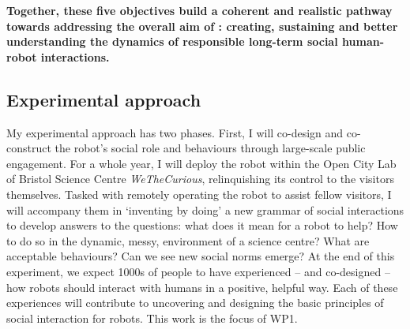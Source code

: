 \begin{framed}

\noindent\bf Together, these five objectives build a coherent and realistic pathway towards
addressing the overall aim of \project: creating, sustaining and better
understanding the dynamics of responsible long-term social human-robot
interactions.

\end{framed}










\subsection{Experimental approach}

My experimental approach has two phases. First, I will co-design and
co-construct the robot's social role and behaviours through large-scale public
engagement. For a whole year, I will deploy the \project robot within the Open
City Lab of Bristol Science Centre \emph{WeTheCurious}, relinquishing its
control to the visitors themselves. Tasked with remotely operating the robot to
assist fellow visitors, I will accompany them in `inventing by doing' a new
grammar of social interactions to develop answers to the questions: what does it
mean for a robot to help? How to do so in the dynamic, messy, environment of a
science centre? What are acceptable behaviours? Can we see new social norms
emerge? At the end of this experiment, we expect 1000s of people to have
experienced -- and co-designed -- how robots should interact with humans in a
positive, helpful way. Each of these experiences will contribute to
uncovering and designing the basic principles of social interaction for robots.
This work is the focus of WP1.

